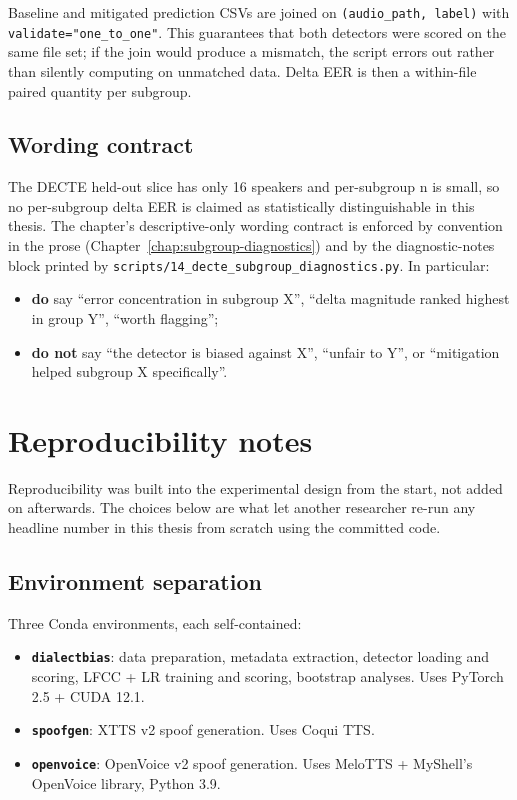 Baseline and mitigated prediction CSVs are joined on
\texttt{(audio\_path, label)} with \texttt{validate="one\_to\_one"}.
This guarantees that both detectors were scored on the same file
set; if the join would produce a mismatch, the script errors out
rather than silently computing on unmatched data. Delta EER is then
a within-file paired quantity per subgroup.

\subsection{Wording contract}
\label{sec:methodology-subgroups-wording}

The DECTE held-out slice has only 16 speakers and per-subgroup n is
small, so no per-subgroup delta EER is claimed as statistically
distinguishable in this thesis. The chapter's descriptive-only
wording contract is enforced by convention in the prose
(Chapter~\ref{chap:subgroup-diagnostics}) and by the
diagnostic-notes block printed by
\texttt{scripts/14\_decte\_subgroup\_diagnostics.py}. In particular:

\begin{itemize}
    \item \textbf{do} say ``error concentration in subgroup X'', ``delta magnitude
        ranked highest in group Y'', ``worth flagging'';
    \item \textbf{do not} say ``the detector is biased against X'', ``unfair to Y'',
        or ``mitigation helped subgroup X specifically''.
\end{itemize}


\section{Reproducibility notes}
\label{sec:methodology-reproducibility}

Reproducibility was built into the experimental design from the
start, not added on afterwards. The choices below are what let
another researcher re-run any headline number in this thesis from
scratch using the committed code.

\subsection{Environment separation}
\label{sec:methodology-repro-envs}

Three Conda environments, each self-contained:

\begin{itemize}
    \item \textbf{\texttt{dialectbias}}: data preparation, metadata extraction,
        detector loading and scoring, LFCC + LR training and scoring,
        bootstrap analyses. Uses PyTorch 2.5 + CUDA 12.1.
    \item \textbf{\texttt{spoofgen}}: XTTS v2 spoof generation. Uses Coqui TTS.
    \item \textbf{\texttt{openvoice}}: OpenVoice v2 spoof generation. Uses MeloTTS +
        MyShell's OpenVoice library, Python 3.9.
\end{itemize}

